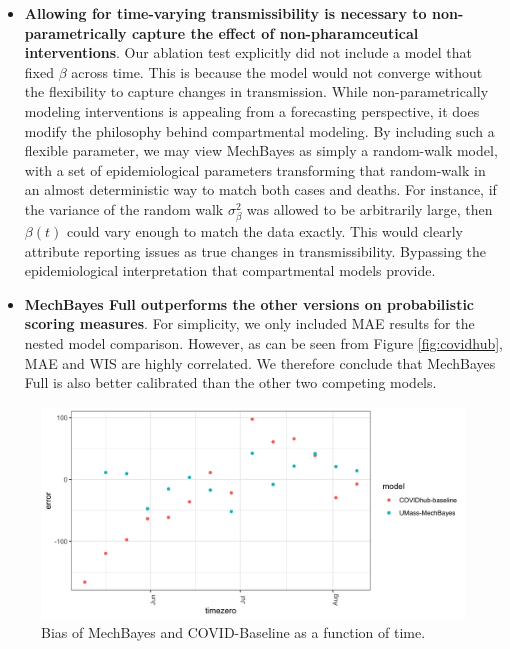 \documentclass[11pt]{amsart}
\begin{document}
\begin{itemize}
\item \textbf{Allowing for time-varying transmissibility is necessary to non-parametrically capture the effect of non-pharamceutical interventions}. Our ablation test explicitly did not include a model that fixed $\beta$ across time. This is because the model would not converge without the flexibility to capture changes in transmission. While non-parametrically modeling interventions is appealing from a forecasting perspective, it does modify the philosophy behind compartmental modeling. By including such a flexible parameter, we may view MechBayes as simply a random-walk model, with a set of epidemiological parameters transforming that random-walk in an almost deterministic way to match both cases and deaths. For instance, if the variance of the random walk $\sigma_{\beta}^2$ was allowed to be arbitrarily large, then $\beta(t)$ could vary enough to match the data exactly. This would clearly attribute reporting issues as true changes in transmissibility. Bypassing the epidemiological interpretation that compartmental models provide. 


\item \textbf{MechBayes Full outperforms the other versions on probabilistic scoring measures}. For simplicity, we only included MAE results for the nested model comparison. However, as can be seen from Figure \ref{fig:covidhub}, MAE and WIS are highly correlated. We therefore conclude that MechBayes Full is also better calibrated than the other two competing models. 
\end{itemize}


\begin{figure}
\centering
\includegraphics[scale=.15]{bias_by_timezero.png}
\caption{Bias of MechBayes and COVID-Baseline as a function of time.  }
\label{fig:results_discussion}
\end{figure}
\end{document}
